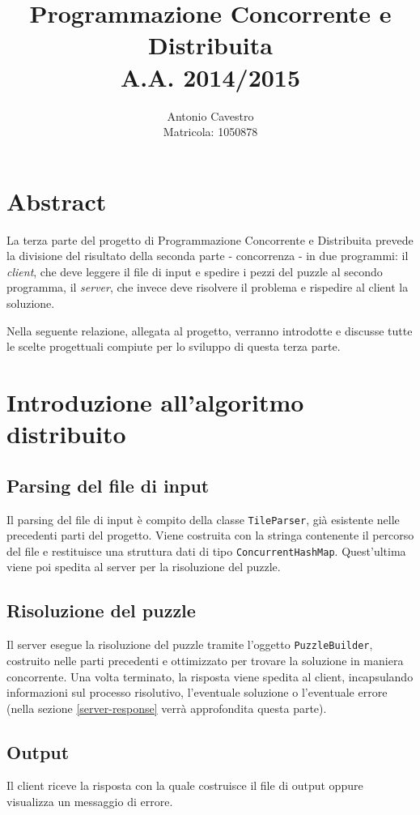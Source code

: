 \documentclass[a4paper, 12pt]{article}
\title{Programmazione Concorrente e Distribuita \\ A.A. 2014/2015 \\
\vspace{2 mm}{\small PuzzleSolver - Parte 3}}
\author{Antonio Cavestro \\ \vspace{2 mm} {\small Matricola: 1050878}}
\date{}
\begin{document}
\maketitle

\section{Abstract}

La terza parte del progetto di Programmazione Concorrente e Distribuita
prevede la divisione del risultato della seconda parte - concorrenza - in due
programmi: il \emph{client}, che deve leggere il file di input e spedire i pezzi
del puzzle al secondo programma, il \emph{server}, che invece deve risolvere
il problema e rispedire al client la soluzione.

Nella seguente relazione, allegata al progetto, verranno introdotte e discusse
tutte le scelte progettuali compiute per lo sviluppo di questa terza parte.

\section{Introduzione all'algoritmo distribuito}
\subsection{Parsing del file di input}
Il parsing del file di input è compito della classe \verb|TileParser|, già
esistente nelle precedenti parti del progetto. Viene costruita con la stringa
contenente il percorso del file e restituisce una struttura dati di tipo
\verb|ConcurrentHashMap|. Quest'ultima viene poi spedita al server
per la risoluzione del puzzle.
\subsection{Risoluzione del puzzle}
Il server esegue la risoluzione del puzzle tramite l'oggetto
\verb|PuzzleBuilder|, costruito nelle parti precedenti e ottimizzato per trovare
la soluzione in maniera concorrente. Una volta terminato, la risposta viene
spedita al client, incapsulando informazioni sul processo risolutivo,
l'eventuale soluzione o l'eventuale errore (nella sezione \ref{server-response}
verrà approfondita questa parte).
\subsection{Output}
Il client riceve la risposta con la quale costruisce il file di output oppure
visualizza un messaggio di errore.
\end{document}

